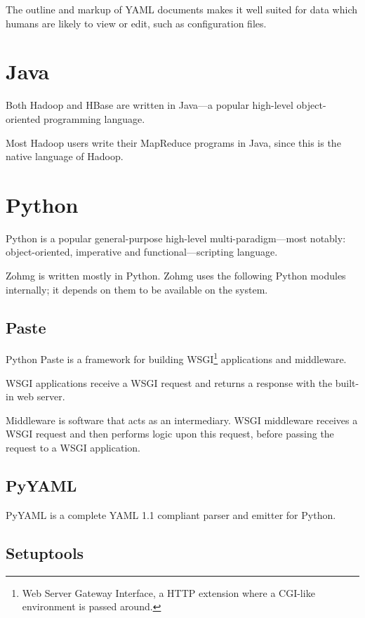 \documentclass[a4paper,10pt]{book}
\begin{document}
The outline and markup of YAML documents makes it well suited for data
which humans are likely to view or edit, such as configuration files.



\section{Java}

Both Hadoop and HBase are written in Java---a popular high-level
object-oriented programming language.

Most Hadoop users write their MapReduce programs in Java, since this is the
native language of Hadoop. \cite{java}



\section{Python}

Python is a popular general-purpose high-level multi-paradigm---most
notably: object-oriented, imperative and functional---scripting language.
\cite{python}

Zohmg is written mostly in Python. Zohmg uses the following Python modules
internally; it depends on them to be available on the system.


\subsection{Paste}

Python Paste is a framework for building WSGI\footnote{Web Server Gateway
Interface, a HTTP extension where a CGI-like environment is passed around.}
applications and middleware. \cite{definitive_guide_to_pylons}

WSGI applications receive a WSGI request and returns a response with the
built-in web server.

Middleware is software that acts as an intermediary. WSGI middleware
receives a WSGI request and then performs logic upon this request, before
passing the request to a WSGI application. \cite{paste}


\subsection{PyYAML}

PyYAML is a complete YAML 1.1 compliant parser and emitter for Python.
\cite{pyyaml}


\subsection{Setuptools}
\end{document}
